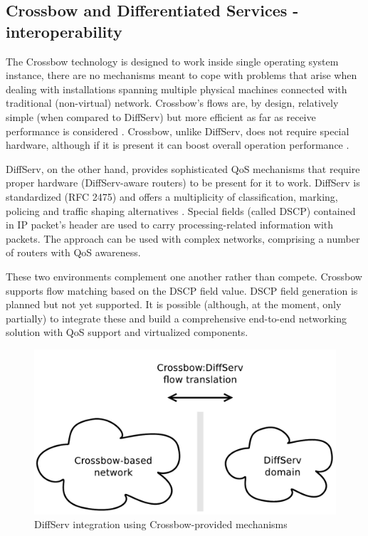 \documentclass[11pt]{book}
\begin{document}
      \subsection{Crossbow and Differentiated Services - interoperability}
      \label{sub:sol:diffserv}

        The Crossbow technology is designed to work inside single operating system instance, there are no mechanisms
        meant to cope with problems that arise when dealing with installations spanning multiple physical machines
        connected with traditional (non-virtual) network. Crossbow's flows are, by design, relatively simple (when
        compared to DiffServ) but more efficient as far as receive performance is considered \cite{xbow-vertically}.
        Crossbow, unlike DiffServ, does not require special hardware, although if it is present it can boost overall
        operation performance \cite{xbow-vertically}.

        DiffServ, on the other hand, provides sophisticated QoS mechanisms that require proper hardware (DiffServ-aware
        routers) to be present for it to work. DiffServ is standardized (RFC 2475) and offers a multiplicity of
        classification, marking, policing and traffic shaping alternatives \cite{rfc2475}. Special fields (called DSCP)
        contained in IP packet's header are used to carry processing-related information with packets. The approach can
        be used with complex networks, comprising a number of routers with QoS awareness.

        These two environments complement one another rather than compete. Crossbow supports flow matching based on the
        DSCP field value. DSCP field generation is planned but not yet supported. It is possible (although, at the
        moment, only partially) to integrate these and build a comprehensive end-to-end networking solution with QoS
        support and virtualized components.

        \begin{figure}[H]
          \begin{center}
            \includegraphics[width=.7\textwidth]{img/solaris/xbow-diffserv.pdf}
          \end{center}

          \caption{DiffServ integration using Crossbow-provided mechanisms}
        \end{figure}
\end{document}
